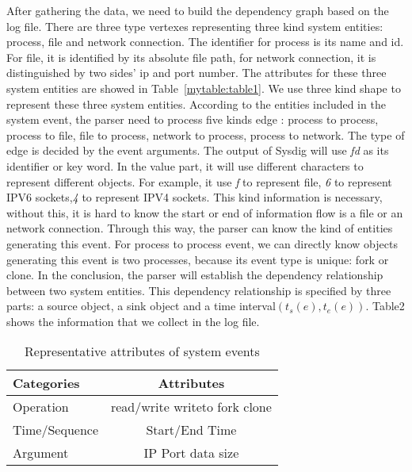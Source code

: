 After gathering the data, we need to build the dependency graph based on the log file. There are three type vertexes representing three kind system entities: process, file and network connection.
The identifier for process is its name and id.  For file, it is identified by its absolute file path, for network connection, it is distinguished by two sides' ip and port number. The attributes for these three system entities are showed in Table~\ref{mytable:table1}. We use three kind shape to represent these three system entities. According to the entities included in the system event, the parser need to process five kinds edge : process to process, process to file, file to process, network to process, process to network. The type of edge is decided by the event arguments. The output of Sysdig will use \textit{fd} as its identifier or key word. In the value part, it will use different characters to represent different objects. For example, it use \textit{f} to represent file, \textit{6} to represent IPV6 sockets,\textit{4} to represent IPV4 sockets. This kind information is necessary, without this, it is hard to know the start or end of information flow is a file or an network connection.  Through this way, the parser can know the kind of entities generating this event. For process to process event, we can directly know objects generating this event is two processes, because its event type is unique: fork or clone. In the conclusion, the parser will establish the dependency relationship between two system entities. This dependency relationship is specified by three parts: a source object, a sink object and a time interval$(t_s(e), t_e(e))$. Table2 shows the information that we collect in the log file.

\begin{table}
	\centering
	\caption{Representation Of System Entities}
	\label{mytable:table1}
\end{table}
\begin{table}
	\centering
	\caption{Representative attributes of system events}
	\label{table2}
	\begin{tabular}{|l|c|}
		\hline
		Categories    & Attributes                    \\ \hline
		Operation     & read/write writeto fork clone \\ \hline
		Time/Sequence & Start/End Time                \\ \hline
		Argument      & IP Port data size             \\ \hline
	\end{tabular}
\end{table}

